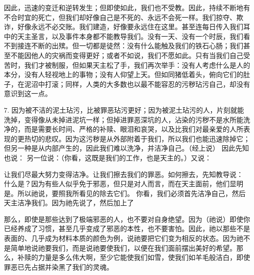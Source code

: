 因此，迅速的变迁和逆转发生；但即使如此，我们也不受教。因此，持续不断地有不合时宜的死亡，但我们却好像自己是不死的、永远不会死一样。我们掠夺、欺诈，好像永远不必交账。我们建造，好像要永远住在这里。甚至连每日传入我们耳中的天主圣言，以及事件本身都不能教导我们。没有一天、没有一个时辰，我们看不到接连不断的出殡。但一切都是徒然：没有什么能触及我们的铁石心肠；我们甚至不能因他人的灾祸而变得更好；或者不如说，我们不愿如此。只有当我们自己受苦时，我们才被制服，但如果天主松了手，我们再次举手：没有人考虑什么是人的本分，没有人轻视地上的事物；没有人仰望上天。但如同猪低着头，俯向它们的肚子，在泥沼中打滚；同样，人类的大多数也以最不能容忍的污秽玷污自己，却没有意识到这一点。\par

7. 因为被不洁的泥土玷污，比被罪恶玷污更好；因为被泥土玷污的人，片刻就能洗掉，变得像从未掉进泥坑一样；但掉进罪恶深坑的人，沾染的污秽不是水所能洗净的，而是需要长时间、严格的补赎、眼泪和哀哭，以及比我们对最亲爱的人所表现的更热切的悲叹。因为这污秽是从外部附着于我们，所以我们也能迅速除掉它；但另一种是从内部产生的，因此我们难以洗净，并洁净自己。（经上说） 因此先知也说： 另一位说：（你看，这既是我们的工作，也是天主的。）又说：\par

让我们尽最大努力变得洁净。让我们擦去我们的罪恶。如何擦去，先知教导说： 什么是？因为有些人似乎免于邪恶，但只是对人而言，而在天主面前，他们显明是。所以祂说，要照我所看见的除去它们。 你看，我们必须首先洁净自己，然后天主洁净我们。因为祂先说了，然后加上了\par

那么，即使是那些达到了极端邪恶的人，也不要对自身绝望。因为（祂说）即使你已经养成了习惯，甚至几乎变成了邪恶的本性，也不要害怕。因此，祂以那些不是表面的、几乎成为材料本质的颜色为例，说祂要把它们变为相反的状态。因为祂不是简单地说祂要我们，而是说祂要使我们，以便在我们面前摆出美好的希望。那么，补赎的力量是多么伟大啊，至少它能使我们如雪，使我们如羊毛般洁白，即使罪恶已先占据并染黑了我们的灵魂。\par

